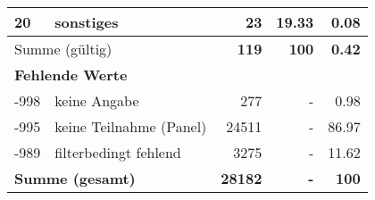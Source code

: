 \begin{longtable}{lXrrr}
     20 &
     \multicolumn{1}{X}{ sonstiges   } &


       \num{23} &
       \num[round-mode=places,round-precision=2]{19.33} &
         \num[round-mode=places,round-precision=2]{0.08} \\
     \midrule
     \multicolumn{2}{l}{Summe (gültig)} &
       \textbf{\num{119}} &
     \textbf{\num{100}} &
       \textbf{\num[round-mode=places,round-precision=2]{0.42}} \\
     \multicolumn{5}{l}{\textbf{Fehlende Werte}}\\
       -998 &
       keine Angabe &
         \num{277} &
        - &
         \num[round-mode=places,round-precision=2]{0.98} \\
       -995 &
       keine Teilnahme (Panel) &
         \num{24511} &
        - &
         \num[round-mode=places,round-precision=2]{86.97} \\
       -989 &
       filterbedingt fehlend &
         \num{3275} &
        - &
         \num[round-mode=places,round-precision=2]{11.62} \\
     \midrule
     \multicolumn{2}{l}{\textbf{Summe (gesamt)}} &
          \textbf{\num{28182}} &
        \textbf{-} &
        \textbf{\num{100}} \\
     \bottomrule
     \end{longtable}
     
